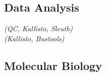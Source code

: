 \documentclass[]{resume}
\begin{document}
\begin{minipage}[t]{0.33\textwidth}
\subsection{Data Analysis}
 {\footnotesize \textit{(QC, Kallisto, Sleuth)}}\\
 {\footnotesize \textit{(Kallisto, Bustools)}}
\sectionsep

\subsection{Molecular Biology}
\\
\\
\\
\sectionsep




%
%

\end{minipage}
\hfill
\end{document}
